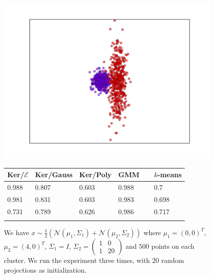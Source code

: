 \documentclass[aps,preprint,nofootinbib,floatfix]{revtex4-1}
\begin{document}
\begin{figure}
\begin{minipage}{.49\textwidth}
\includegraphics[scale=.45]{blob_cigar.pdf}
\end{minipage}
\begin{minipage}{.49\textwidth}
\begin{tabular}{ l l l l l}
\hline
Ker/$\mathcal{E}$ & Ker/Gauss & Ker/Poly & GMM~~ & $k$-means \\
\hline
0.988 &
0.807 &
0.603 &
0.988 & 
0.7 \\
0.981 & 
0.831 &
0.603 &
0.983 & 
0.698 \\
0.731 & 
0.789 &
0.626 & 
0.986 &
0.717 \\
\\
\hline
\end{tabular}
\end{minipage}
\caption{\label{fig:weird1}
We have $x \sim \tfrac{1}{2}\left( \mathcal{N}(\mu_1, \Sigma_1) +
\mathcal{N}(\mu_2, \Sigma_2)\right)$ where $\mu_1 = (0,0)^T$, $\mu_2=(4,0)^T$,
$\Sigma_1 = I$, 
$\Sigma_2 = \left( \begin{smallmatrix} 
1 & 0 \\ 1 & 20
\end{smallmatrix}\right)$
and $500$ points on each cluster. We run the experiment three times,
with 20 random projections as initialization.
}
\end{figure}
\end{document}
